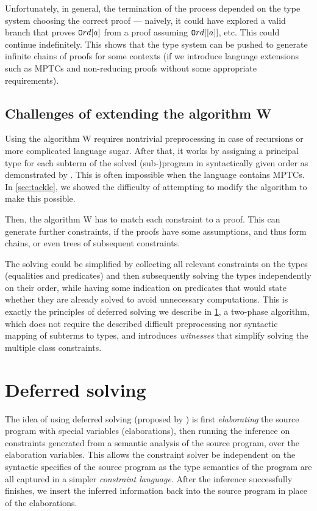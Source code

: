 Unfortunately, in general, the termination of the process depended on the type system choosing the correct proof --- naively, it could have explored a valid branch that proves $\mathtt{O}rd [a]$ from a proof assuming $\mathtt{O}rd [[a]]$, etc. This could continue indefinitely. This shows that the type system can be pushed to generate infinite chains of proofs for some contexts (if we introduce language extensions such as MPTCs and non-reducing proofs without some appropriate requirements).

\subsection{Challenges of extending the algorithm W}


Using the algorithm W requires nontrivial preprocessing in case of recursions or more complicated language sugar. After that, it works by assigning a principal type for each subterm of the solved (sub-)program in syntactically given order as demonstrated by \citet{jones1999typing}. This is often impossible when the language contains MPTCs. In \cref{sec:tackle}, we showed the difficulty of attempting to modify the algorithm to make this possible.

Then, the algorithm W has to match each constraint to a proof. This can generate further constraints, if the proofs have some assumptions, and thus form chains, or even trees of subsequent constraints.

The solving could be simplified by collecting all relevant constraints on the types (equalities and predicates) and then subsequently solving the types independently on their order, while having some indication on predicates that would state whether they are already solved to avoid unnecessary computations. This is exactly the principles of deferred solving we describe in \cref{defer_solve}, a two-phase algorithm, which does not require the described difficult preprocessing nor syntactic mapping of subterms to types, and introduces \emph{witnesses} that simplify solving the multiple class constraints.

\section{Deferred solving}
\label{defer_solve}

The idea of using deferred solving (proposed by \citet{vytiniotis2011outsidein}) is first \emph{elaborating} the source program with special variables (elaborations), then running the inference on constraints generated from a semantic analysis of the source program, over the elaboration variables. This allows the constraint solver be independent on the syntactic specifics of the source program as the type semantics of the program are all captured in a simpler \emph{constraint language}. After the inference successfully finishes, we insert the inferred information back into the source program in place of the elaborations.

